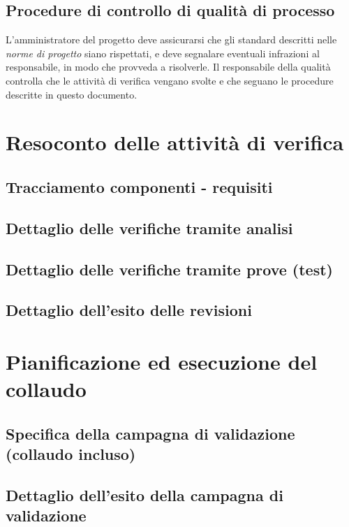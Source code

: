 \documentclass[a4paper]{article}
\begin{document}
\subsection{Procedure di controllo di qualit\`a di processo}
L'amministratore del progetto deve assicurarsi che gli standard descritti nelle \textit{norme di progetto} siano rispettati, e deve segnalare eventuali infrazioni al responsabile, in modo che provveda a risolverle. Il responsabile della qualit\`a controlla che le attivit\`a di verifica vengano svolte e che seguano le procedure descritte in questo documento.


\section{Resoconto delle attivit\`a di verifica}

\subsection{Tracciamento componenti - requisiti}
\subsection{Dettaglio delle verifiche tramite analisi}
\subsection{Dettaglio delle verifiche tramite prove (test)}
\subsection{Dettaglio dell'esito delle revisioni}


\section{Pianificazione ed esecuzione del collaudo}

\subsection{Specifica della campagna di validazione (collaudo incluso)}
\subsection{Dettaglio dell'esito della campagna di validazione}
\end{document}
